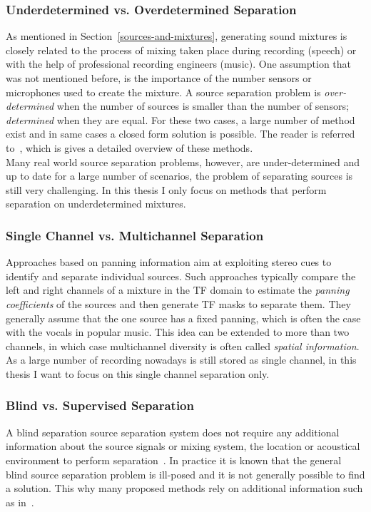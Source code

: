 \subsubsection*{Underdetermined vs. Overdetermined Separation}
As mentioned in Section~\ref{sources-and-mixtures}, generating sound mixtures is closely related to the process of mixing taken place during recording (speech) or with the help of professional recording engineers (music).
One assumption that was not mentioned before, is the importance of the number sensors or microphones used to create the mixture.
A source separation problem is \emph{over-determined} when the number of sources is smaller than the number of sensors; \emph{determined} when they are equal.
For these two cases, a large number of method exist and in same cases a closed form solution is possible.
The reader is referred to~\cite{common10}, which is gives a detailed overview of these methods.\\
Many real world source separation problems, however, are under-determined and up to date for a large number of scenarios, the problem of separating sources is still very challenging.
In this thesis I only focus on methods that perform separation on underdetermined mixtures.

\subsubsection*{Single Channel vs. Multichannel Separation}
Approaches based on panning information aim at exploiting stereo cues to identify and separate individual sources. Such approaches typically compare the left and right channels of a mixture in the TF domain to estimate the \textit{panning coefficients} of the sources and then generate TF masks to separate them. They generally assume that the one source has a fixed panning, which is often the case with the vocals in popular music. This idea can be extended to more than two channels, in which case multichannel diversity is often called \textit{spatial information}.
As a large number of recording nowadays is still stored as single channel, in this thesis I want to focus on this single channel separation only.

\subsubsection*{Blind vs. Supervised Separation}
A blind separation source separation system does not require any additional information about the source signals or mixing system, the location or acoustical environment to perform separation~\cite{makino07}.
In practice it is known that the general blind source separation problem is ill-posed and it is not generally possible to find a solution.
This why many proposed methods rely on additional information such as in~\cite{liutkus13, ewert14}.

